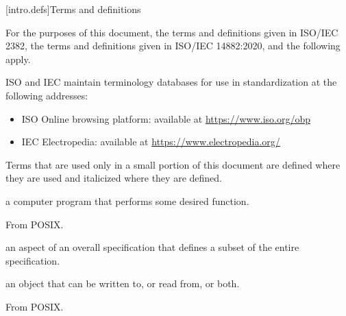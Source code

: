 
[intro.defs]{Terms and definitions}

\pnum
{}%
For the purposes of this document,
the terms and definitions given in ISO/IEC 2382,
the terms and definitions given in ISO/IEC 14882:2020,
and the following apply.

\pnum
ISO and IEC maintain terminology databases for use in standardization
at the following addresses:
\begin{itemize}
\item ISO Online browsing platform: available at \url{https://www.iso.org/obp}
\item IEC Electropedia: available at \url{https://www.electropedia.org/}
\end{itemize}

\pnum
Terms that are used only in a small portion of this document are defined where
they are used and italicized where they are defined.

%
a computer program that performs some desired function.

\begin{defnote}
From POSIX.
\end{defnote}

%
an aspect of an overall specification that defines a subset of the entire
specification.

%
an object that can be written to, or read from, or both.

\begin{defnote}
From POSIX.
\end{defnote}
